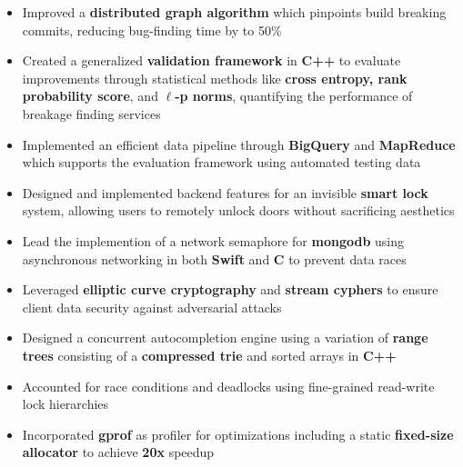 \documentclass[10pt,a4paper,ragged2e]{altacv}
\begin{document}
\begin{itemize}
    \item Improved a \textbf{distributed graph algorithm} which pinpoints build breaking commits,
      reducing bug-finding time by to 50\%
    \item Created a generalized \textbf{validation framework} in \textbf{C++} to evaluate improvements
      through statistical methods like \textbf{cross entropy, rank probability score}, and \textbf{$\ell$-p norms},
      quantifying the performance of breakage finding services
    \item Implemented an efficient data pipeline through \textbf{BigQuery} and \textbf{MapReduce}
      which supports the evaluation framework using automated testing data
\end{itemize}

\divider

\begin{itemize}
    \item Designed and implemented backend features for an invisible \textbf{smart lock} system,
        allowing users to remotely unlock doors without sacrificing aesthetics
    \item Lead the implemention of a network semaphore for \textbf{mongodb} using asynchronous networking in both \textbf{Swift} and \textbf{C} to prevent data races
    \item Leveraged \textbf{elliptic curve cryptography} and \textbf{stream cyphers} to ensure client data security against adversarial attacks
\end{itemize}

\iffalse
{}
\begin{itemize}
    \item Designed a concurrent autocompletion engine using a variation of \textbf{range trees} consisting of a \textbf{compressed trie} and sorted arrays in \textbf{C++}
    \item Accounted for race conditions and deadlocks using fine-grained read-write lock hierarchies
    \item Incorporated \textbf{gprof} as profiler for optimizations including a static \textbf{fixed-size allocator} to achieve \textbf{20x} speedup
\end{itemize}
\end{document}
